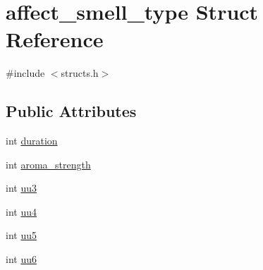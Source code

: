 \hypertarget{structaffect__smell__type}{\section{affect\-\_\-smell\-\_\-type Struct Reference}
\label{structaffect__smell__type}
}


{\ttfamily \#include $<$structs.\-h$>$}

\subsection*{Public Attributes}
\begin{DoxyCompactItemize}
\item 
int \hyperlink{structaffect__smell__type_a1c7091f7d2291dee192865dc101cd88c}{duration}
\item 
int \hyperlink{structaffect__smell__type_af10dcb912eb0bde53795a3a6c76d16ee}{aroma\-\_\-strength}
\item 
int \hyperlink{structaffect__smell__type_a9ef4ccd245472ac823f6e44550fe82ab}{uu3}
\item 
int \hyperlink{structaffect__smell__type_afd48276e2c9073fd1cded287224ba095}{uu4}
\item 
int \hyperlink{structaffect__smell__type_ac7b894d10844d10d447f4350e0304c85}{uu5}
\item 
int \hyperlink{structaffect__smell__type_adb1543d2f301fb9532831c9325147edd}{uu6}
\end{DoxyCompactItemize}


